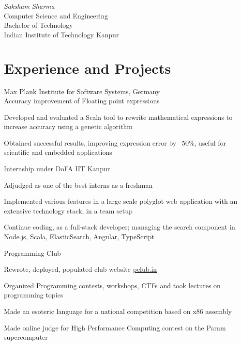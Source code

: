 \documentclass{tccv}
\begin{document}
{ \textit{Saksham \textcolor{myred}{Sharma}}}
\medskip\\
\large{Computer Science and Engineering}\\
\large{Bachelor of Technology}\\
{Indian Institute of Technology Kanpur}

\vspace{-0.4cm}
\section{Experience and Projects}
\vspace{-0.1cm}
\begin{experience}

  {Max Plank Institute for Software Systems, \small{Germany}\\
  Accuracy improvement of Floating point expressions}
  {
  \item Developed and evaluated a Scala tool to rewrite
    mathematical expressions to increase accuracy using a genetic
    algorithm
  \item Obtained successful results, improving expression error by
    ~50\%, useful for scientific and embedded applications
  }

  {Internship under DoFA IIT Kanpur}
  {
  \item Adjudged as one of the best interns as a freshman
  \item Implemented various features in a large scale polyglot web
    application with an extensive technology stack, in a team setup
  \item Continue coding, as a full-stack developer;
    managing the search component in Node.js, Scala, ElasticSearch,
    Angular, TypeScript
  }

  {Programming Club}
  {
  \item Rewrote, deployed, populated club website \href{http://pclub.in}{pclub.in}
  \item Organized Programming contests, workshops, CTFs and took
    lectures on programming topics
  }

  {
  \item Made an esoteric language for a national
    competition based on x86 assembly
  \item Made online judge for High Performance Computing contest
    on the Param supercomputer
  }


\end{experience}
\end{document}
